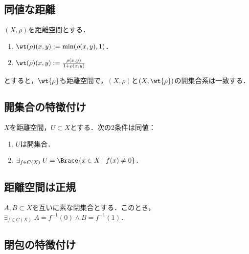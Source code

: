 \documentclass[uplatex,dvipdfmx]{jsreport}
\begin{document}
\subsection{同値な距離}

\begin{proposition}
    $(X,\rho)$を距離空間とする．
    \begin{enumerate}
        \item $\wt(\rho)(x,y):=\min(\rho(x,y),1)$．
        \item $\wt(\rho)(x,y):=\frac{\rho(x,y)}{1+\rho(x,y)}$
    \end{enumerate}
    とすると，$\wt{\rho}$も距離空間で，$(X,\rho)$と$(X,\wt{\rho})$の開集合系は一致する．
\end{proposition}

\subsection{開集合の特徴付け}

\begin{proposition}
    $X$を距離空間，$U\subset X$とする．次の2条件は同値：
    \begin{enumerate}
        \item $U$は開集合．
        \item $\exists_{f\in C(X)}\;U=\Brace{x\in X\mid f(x)\ne0}$．
    \end{enumerate}
\end{proposition}

\subsection{距離空間は正規}

\begin{proposition}
    $A,B\subset X$を互いに素な閉集合とする．このとき，$\exists_{f\in C(X)}\;A=f^{-1}(0)\land B=f^{-1}(1)$．
\end{proposition}

\subsection{閉包の特徴付け}
\end{document}
